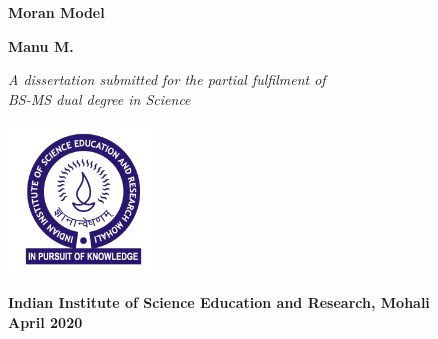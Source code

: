 \begin{titlepage}
  \begin{center}
    \LARGE
    \textbf{Moran Model}

    \vspace{1.5cm}
    \Large
    \textbf{Manu M.}

    \vfill
    \Large
    \textit{A dissertation submitted for the partial fulfilment of\\
    BS-MS dual degree in Science}

    \vspace{0.8cm}

    \includegraphics[width=0.3\textwidth]{C0/Figs/IISER_Mohali_logo.png}

    \large
    \textbf{Indian Institute of Science Education and Research, Mohali}\\
    \large
    \textbf{April 2020}
  \end{center}
\end{titlepage}
